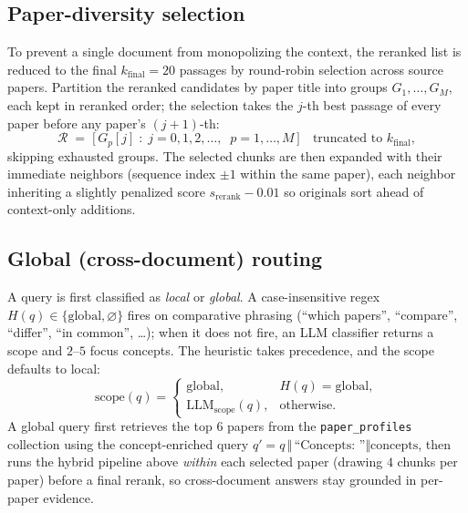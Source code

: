 \documentclass[11pt,a4paper]{article}
\newcommand{\code}[1]{\texttt{\small #1}}
\begin{document}
\subsection{Paper-diversity selection}
To prevent a single document from monopolizing the context, the reranked list is
reduced to the final $k_{\mathrm{final}}=20$ passages by round-robin selection
across source papers. Partition the reranked candidates by paper title into
groups $G_1,\dots,G_M$, each kept in reranked order; the selection takes the
$j$-th best passage of every paper before any paper's $(j{+}1)$-th:
\begin{equation}
  \mathcal{R} \;=\; \big[\, G_p[j] \;:\; j=0,1,2,\dots,\;\; p=1,\dots,M \,\big]
  \quad\text{truncated to } k_{\mathrm{final}},
\end{equation}
skipping exhausted groups. The selected chunks are then expanded with their
immediate neighbors (sequence index $\pm 1$ within the same paper), each neighbor
inheriting a slightly penalized score $s_{\mathrm{rerank}}-0.01$ so originals
sort ahead of context-only additions.

\subsection{Global (cross-document) routing}
A query is first classified as \emph{local} or \emph{global}. A case-insensitive
regex $H(q)\in\{\text{global},\varnothing\}$ fires on comparative phrasing
(``which papers'', ``compare'', ``differ'', ``in common'', \dots); when it does
not fire, an LLM classifier returns a scope and $2$--$5$ focus concepts. The
heuristic takes precedence, and the scope defaults to local:
\begin{equation}
  \mathrm{scope}(q)=
  \begin{cases}
    \text{global}, & H(q)=\text{global},\\[2pt]
    \mathrm{LLM}_{\mathrm{scope}}(q), & \text{otherwise.}
  \end{cases}
\end{equation}
A global query first retrieves the top $6$ papers from the \code{paper\_profiles}
collection using the concept-enriched query $q' = q \,\Vert\, \text{``Concepts:
''}\Vert \mathrm{concepts}$, then runs the hybrid pipeline above
\emph{within} each selected paper (drawing $4$ chunks per paper) before a final
rerank, so cross-document answers stay grounded in per-paper evidence.

\end{document}
